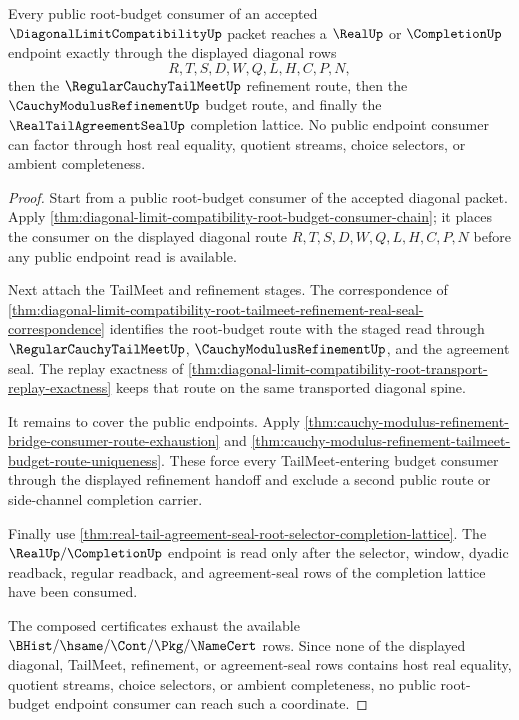 \begin{theorem}
\label{thm:diagonal-limit-compatibility-root-budget-public-route-cover}
Every public root-budget consumer of an accepted
$\DiagonalLimitCompatibilityUp$ packet reaches a $\RealUp$ or $\CompletionUp$
endpoint exactly through the displayed diagonal rows
$$
R,T,S,D,W,Q,L,H,C,P,N,
$$
then the $\RegularCauchyTailMeetUp$ refinement route, then the
$\CauchyModulusRefinementUp$ budget route, and finally the
$\RealTailAgreementSealUp$ completion lattice. No public endpoint consumer can
factor through host real equality, quotient streams, choice selectors, or
ambient completeness.
\end{theorem}
\begin{proof}
Start from a public root-budget consumer of the accepted diagonal packet. Apply
\autoref{thm:diagonal-limit-compatibility-root-budget-consumer-chain}; it
places the consumer on the displayed diagonal route
$R,T,S,D,W,Q,L,H,C,P,N$ before any public endpoint read is available.

Next attach the TailMeet and refinement stages. The correspondence of
\autoref{thm:diagonal-limit-compatibility-root-tailmeet-refinement-real-seal-correspondence}
identifies the root-budget route with the staged read through
$\RegularCauchyTailMeetUp$, $\CauchyModulusRefinementUp$, and the agreement
seal. The replay exactness of
\autoref{thm:diagonal-limit-compatibility-root-transport-replay-exactness}
keeps that route on the same transported diagonal spine.

It remains to cover the public endpoints. Apply
\autoref{thm:cauchy-modulus-refinement-bridge-consumer-route-exhaustion} and
\autoref{thm:cauchy-modulus-refinement-tailmeet-budget-route-uniqueness}. These
force every TailMeet-entering budget consumer through the displayed refinement
handoff and exclude a second public route or side-channel completion carrier.

Finally use
\autoref{thm:real-tail-agreement-seal-root-selector-completion-lattice}. The
$\RealUp/\CompletionUp$ endpoint is read only after the selector, window,
dyadic readback, regular readback, and agreement-seal rows of the completion
lattice have been consumed.

The composed certificates exhaust the available
$\BHist/\hsame/\Cont/\Pkg/\NameCert$ rows. Since none of the displayed diagonal,
TailMeet, refinement, or agreement-seal rows contains host real equality,
quotient streams, choice selectors, or ambient completeness, no public
root-budget endpoint consumer can reach such a coordinate.
\end{proof}
